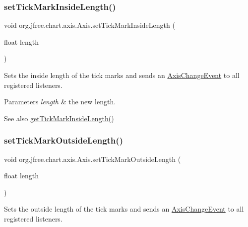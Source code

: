 \subsubsection{\texorpdfstring{set\+Tick\+Mark\+Inside\+Length()}{setTickMarkInsideLength()}}
{\footnotesize\ttfamily void org.\+jfree.\+chart.\+axis.\+Axis.\+set\+Tick\+Mark\+Inside\+Length (\begin{DoxyParamCaption}\item[{float}]{length }\end{DoxyParamCaption})}

Sets the inside length of the tick marks and sends an \mbox{\hyperlink{}{Axis\+Change\+Event}} to all registered listeners.


\begin{DoxyParams}{Parameters}
{\em length} & the new length.\\
\hline
\end{DoxyParams}
\begin{DoxySeeAlso}{See also}
\mbox{\hyperlink{classorg_1_1jfree_1_1chart_1_1axis_1_1_axis_a6148f15b99e9ba54ac3a3793e16e3110}{get\+Tick\+Mark\+Inside\+Length()}} 
\end{DoxySeeAlso}
\mbox{\label{classorg_1_1jfree_1_1chart_1_1axis_1_1_axis_a6a52712e5ddf81c046eac2f1b4894576}} 
\subsubsection{\texorpdfstring{set\+Tick\+Mark\+Outside\+Length()}{setTickMarkOutsideLength()}}
{\footnotesize\ttfamily void org.\+jfree.\+chart.\+axis.\+Axis.\+set\+Tick\+Mark\+Outside\+Length (\begin{DoxyParamCaption}\item[{float}]{length }\end{DoxyParamCaption})}

Sets the outside length of the tick marks and sends an \mbox{\hyperlink{}{Axis\+Change\+Event}} to all registered listeners.


